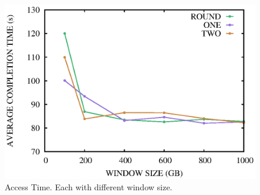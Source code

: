 \documentclass[10pt,conference,letterpaper]{IEEEtran}
\begin{document}
\begin{figure}[!htbp]
\centering
\includegraphics[scale=0.4]{figures/window_size_time.eps}
\caption{Access Time. Each with different window size.}
\label{fig:time_windowsize}
\end{figure}
\end{document}
